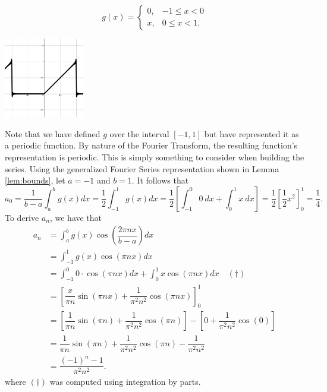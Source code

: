 \documentclass[11pt]{amsart}
\theoremstyle{plain}
\theoremstyle{definition}
\begin{document}
\begin{minipage}{0.5\textwidth}
    $$g(x) = \begin{cases}
        0, & -1 \leq x < 0 \\
        x, & 0 \leq x < 1.
    \end{cases}$$
\end{minipage}
\begin{minipage}{0.5\textwidth}
        \includegraphics[width=35mm]{Images/complex_full.png}
\end{minipage}
Note that we have defined $g$ over the interval $[-1,1]$ but have represented it as a periodic function. By nature of the Fourier Transform, the resulting function's representation is periodic. This is simply something to consider when building the series. Using the generalized Fourier Series representation shown in Lemma \ref{lem:bounds}, let $a=-1$ and $b=1$. It follows that $$a_0=\dfrac{1}{b-a}\int_{a}^{b}g(x)dx = \dfrac{1}{2}\int_{-1}^{1}g(x)dx= \dfrac{1}{2}\left[\int_{-1}^{0}0\ dx + \int_{0}^{1}x\ dx\right]= \dfrac{1}{2}\left[\dfrac{1}{2}x^2\right]_{0}^{1} = \dfrac{1}{4}.$$
To derive $a_n$, we have that
\begin{align*}
    a_n &= \int_{a}^{b}g(x)\cos\left(\dfrac{2\pi nx}{b-a}\right)dx\\
        &= \int_{-1}^{1}g(x)\cos\left(\pi nx\right)dx\\
        &= \int_{-1}^{0}0\cdot\cos\left(\pi nx\right)dx + \int_{0}^{1}x\cos\left(\pi nx\right)dx\quad (\dagger)\\
        &= \left[\dfrac{x}{\pi n}\sin(\pi nx) + \dfrac{1}{\pi^2 n^2}\cos(\pi nx)\right]_0^1\\
        &= \left[\dfrac{1}{\pi n}\sin(\pi n) + \dfrac{1}{\pi^2 n^2}\cos(\pi n)\right] - \left[0 + \dfrac{1}{\pi^2 n^2}\cos(0)\right]\\
        &= \dfrac{1}{\pi n}\sin(\pi n) + \dfrac{1}{\pi^2 n^2}\cos(\pi n) -\dfrac{1}{\pi^2 n^2}\\
        &= \dfrac{(-1)^n-1}{\pi^2 n^2}.
\end{align*}
where $(\dagger)$ was computed using integration by parts. 
\end{document}
